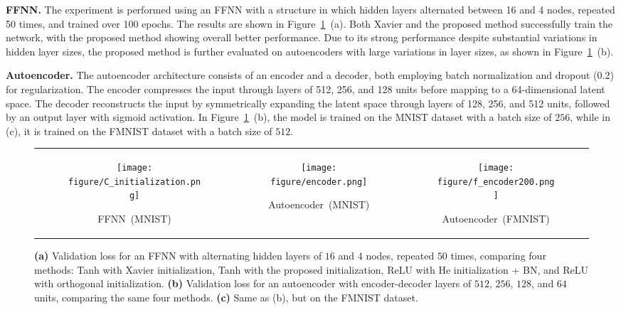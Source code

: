 \documentclass{article} \usepackage{iclr2025_conference,times}
\begin{document}
\textbf{FFNN.} The experiment is performed using an FFNN with a structure in which hidden layers alternated between 16 and 4 nodes, repeated 50 times, and trained over 100 epochs. The results are shown in Figure~\ref{fig:varyingdim}~(a). Both Xavier and the proposed method successfully train the network, with the proposed method showing overall better performance. Due to its strong performance despite substantial variations in hidden layer sizes, the proposed method is further evaluated on autoencoders with large variations in layer sizes, as shown in Figure~\ref{fig:varyingdim}~(b).

\textbf{Autoencoder.} The autoencoder architecture consists of an encoder and a decoder, both employing batch normalization and dropout (0.2) for regularization. The encoder compresses the input through layers of 512, 256, and 128 units before mapping to a 64-dimensional latent space. The decoder reconstructs the input by symmetrically expanding the latent space through layers of 128, 256, and 512 units, followed by an output layer with sigmoid activation. In Figure~\ref{fig:varyingdim}~(b), the model is trained on the MNIST dataset with a batch size of $256$, while in (c), it is trained on the FMNIST dataset with a batch size of $512$.



\begin{figure}[h!]
\centering 
\begin{tabular}{ccc}
\begin{subfigure}[b]{0.31\textwidth}
    \centering
    \texttt{[image: figure/C\_initialization.png]}
    \caption{FFNN~(MNIST)}
\end{subfigure} &
\begin{subfigure}[b]{0.31\textwidth}
    \centering
    \texttt{[image: figure/encoder.png]}
    \caption{Autoencoder~(MNIST)}
\end{subfigure} &
\begin{subfigure}[b]{0.31\textwidth}
    \centering
    \texttt{[image: figure/f\_encoder200.png]}
    \caption{Autoencoder~(FMNIST)}
\end{subfigure} 
\end{tabular}
\caption{\textbf{(a)} Validation loss for an FFNN with alternating hidden layers of $16$ and $4$ nodes, repeated $50$ times, comparing four methods:
Tanh with Xavier initialization,
Tanh with the proposed initialization,
ReLU with He initialization + BN, and ReLU with orthogonal initialization. \textbf{(b)} Validation loss for an autoencoder with encoder-decoder layers of $512$, $256$, $128$, and $64$ units, comparing the same four methods. \textbf{(c)} Same as (b), but on the FMNIST dataset.}
\label{fig:varyingdim}
\end{figure}
\end{document}
